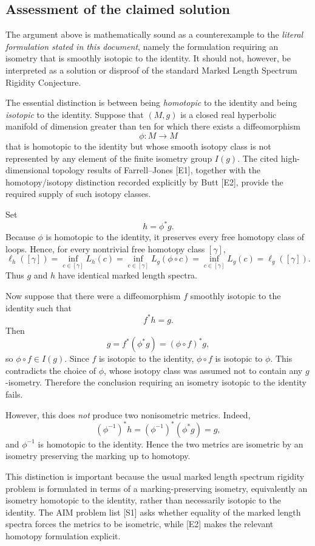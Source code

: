 \documentclass[11pt]{article}
\begin{document}
\subsection{Assessment of the claimed solution}

The argument above is mathematically sound as a counterexample to the
\emph{literal formulation stated in this document}, namely the formulation
requiring an isometry that is smoothly isotopic to the identity.  It should
not, however, be interpreted as a solution or disproof of the standard
Marked Length Spectrum Rigidity Conjecture.

The essential distinction is between being \emph{homotopic} to the identity
and being \emph{isotopic} to the identity.  Suppose that $(M,g)$ is a closed
real hyperbolic manifold of dimension greater than ten for which there exists
a diffeomorphism
\[
\phi:M\to M
\]
that is homotopic to the identity but whose smooth isotopy class is not
represented by any element of the finite isometry group $I(g)$.  The cited
high-dimensional topology results of Farrell--Jones [E1], together with the
homotopy/isotopy distinction recorded explicitly by Butt [E2], provide the
required supply of such isotopy classes.

Set
\[
h=\phi^*g.
\]
Because $\phi$ is homotopic to the identity, it preserves every free homotopy
class of loops.  Hence, for every nontrivial free homotopy class $[\gamma]$,
\[
\ell_h([\gamma])
=
\inf_{c\in[\gamma]} L_h(c)
=
\inf_{c\in[\gamma]} L_g(\phi\circ c)
=
\inf_{c\in[\gamma]} L_g(c)
=
\ell_g([\gamma]).
\]
Thus $g$ and $h$ have identical marked length spectra.

Now suppose that there were a diffeomorphism $f$ smoothly isotopic to the
identity such that
\[
f^*h=g.
\]
Then
\[
g
=
f^*(\phi^*g)
=
(\phi\circ f)^*g,
\]
so $\phi\circ f\in I(g)$.  Since $f$ is isotopic to the identity,
$\phi\circ f$ is isotopic to $\phi$.  This contradicts the choice of $\phi$,
whose isotopy class was assumed not to contain any $g$-isometry.  Therefore
the conclusion requiring an isometry isotopic to the identity fails.

However, this does \emph{not} produce two nonisometric metrics.  Indeed,
\[
(\phi^{-1})^*h
=
(\phi^{-1})^*(\phi^*g)
=
g,
\]
and $\phi^{-1}$ is homotopic to the identity.  Hence the two metrics are
isometric by an isometry preserving the marking up to homotopy.

This distinction is important because the usual marked length spectrum
rigidity problem is formulated in terms of a marking-preserving isometry,
equivalently an isometry homotopic to the identity, rather than necessarily
isotopic to the identity.  The AIM problem list [S1] asks whether equality of
the marked length spectra forces the metrics to be isometric, while [E2]
makes the relevant homotopy formulation explicit.
\end{document}
